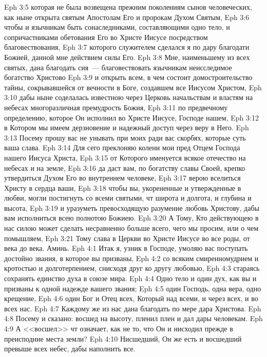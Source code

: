 \vs Eph 3:5 которая не была возвещена прежним поколениям сынов человеческих, как ныне открыта святым Апостолам Его и пророкам Духом Святым,
\vs Eph 3:6 чтобы и язычникам быть сонаследниками, составляющими одно тело, и сопричастниками обетования Его во Христе Иисусе посредством благовествования,
\vs Eph 3:7 которого служителем сделался я по дару благодати Божией, данной мне действием силы Его.
\vs Eph 3:8 Мне, наименьшему из всех святых, дана благодать сия~--- благовествовать язычникам неисследимое богатство Христово
\vs Eph 3:9 и открыть всем, в чем состоит домостроительство тайны, сокрывавшейся от вечности в Боге, создавшем все Иисусом Христом,
\vs Eph 3:10 дабы ныне соделалась известною через Церковь начальствам и властям на небесах многоразличная премудрость Божия,
\vs Eph 3:11 по предвечному определению, которое Он исполнил во Христе Иисусе, Господе нашем,
\vs Eph 3:12 в Котором мы имеем дерзновение и надежный доступ через веру в Него.
\vs Eph 3:13 Посему прошу вас не унывать при моих ради вас скорбях, которые суть ваша слава.
\rsbpar\vs Eph 3:14 Для сего преклоняю колени мои пред Отцем Господа нашего Иисуса Христа,
\vs Eph 3:15 от Которого именуется всякое отечество на небесах и на земле,
\vs Eph 3:16 да даст вам, по богатству славы Своей, крепко утвердиться Духом Его во внутреннем человеке,
\vs Eph 3:17 верою вселиться Христу в сердца ваши,
\vs Eph 3:18 чтобы вы, укорененные и утвержденные в любви, могли постигнуть со всеми святыми, чт широта и долгота, и глубина и высота,
\vs Eph 3:19 и уразуметь превосходящую разумение любовь Христову, дабы вам исполниться всею полнотою Божиею.
\rsbpar\vs Eph 3:20 А Тому, Кто действующею в нас силою может сделать несравненно больше всего, чего мы просим, или о чем помышляем,
\vs Eph 3:21 Тому слава в Церкви во Христе Иисусе во все роды, от века до века. Аминь.
\vs Eph 4:1 Итак я, узник в Господе, умоляю вас поступать достойно звания, в которое вы призваны,
\vs Eph 4:2 со всяким смиренномудрием и кротостью и долготерпением, снисходя друг ко другу любовью,
\vs Eph 4:3 стараясь сохранять единство духа в союзе мира.
\vs Eph 4:4 Одно тело и один дух, как вы и призваны к одной надежде вашего звания;
\vs Eph 4:5 один Господь, одна вера, одно крещение,
\vs Eph 4:6 один Бог и Отец всех, Который над всеми, и через всех, и во всех нас.
\vs Eph 4:7 Каждому же из нас дана благодать по мере дара Христова.
\vs Eph 4:8 Посему и сказано: восшед на высоту, пленил плен и дал дары человекам.
\vs Eph 4:9 А <<восшел>> чт означает, как не то, что Он и нисходил прежде в преисподние места земли?
\vs Eph 4:10 Нисшедший, Он же есть и восшедший превыше всех небес, дабы наполнить все.
